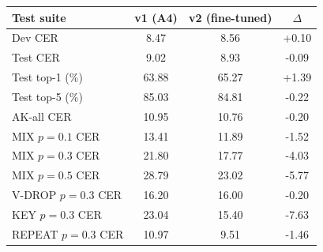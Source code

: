 \begin{tabular}{lccc}
\toprule
Test suite & v1 (A4) & v2 (fine-tuned) & $\Delta$ \\
\midrule
Dev CER & 8.47 & 8.56 & +0.10 \\
Test CER & 9.02 & 8.93 & -0.09 \\
Test top-1 (\%) & 63.88 & 65.27 & +1.39 \\
Test top-5 (\%) & 85.03 & 84.81 & -0.22 \\
AK-all CER & 10.95 & 10.76 & -0.20 \\
MIX $p{=}0.1$ CER & 13.41 & 11.89 & -1.52 \\
MIX $p{=}0.3$ CER & 21.80 & 17.77 & -4.03 \\
MIX $p{=}0.5$ CER & 28.79 & 23.02 & -5.77 \\
V-DROP $p{=}0.3$ CER & 16.20 & 16.00 & -0.20 \\
KEY $p{=}0.3$ CER & 23.04 & 15.40 & -7.63 \\
REPEAT $p{=}0.3$ CER & 10.97 & 9.51 & -1.46 \\
\bottomrule
\end{tabular}